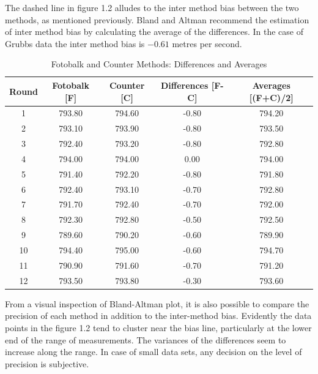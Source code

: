 \documentclass[Chap2main.tex]{subfiles}
\begin{document}
	The dashed line in figure 1.2 alludes to the inter method bias between the two methods, as mentioned previously. Bland and Altman
	recommend the estimation of inter method bias by calculating the average of the differences. In the case of Grubbs data the inter
	method bias is $-0.61$ metres per second.
	\newpage
	\begin{table}[tbh]
		\begin{center}
			
			\begin{tabular}{|c|c|c|c|c|}
				\hline
				Round & Fotobalk [F] & Counter [C] & Differences [F-C] & Averages [(F+C)/2] \\
				\hline
				1 & 793.80 & 794.60 & -0.80 & 794.20 \\
				2 & 793.10 & 793.90 & -0.80 & 793.50 \\
				3 & 792.40 & 793.20 & -0.80 & 792.80 \\
				4 & 794.00 & 794.00 & 0.00 & 794.00 \\
				5 & 791.40 & 792.20 & -0.80 & 791.80 \\
				6 & 792.40 & 793.10 & -0.70 & 792.80 \\
				7 & 791.70 & 792.40 & -0.70 & 792.00 \\
				8 & 792.30 & 792.80 & -0.50 & 792.50 \\
				9 & 789.60 & 790.20 & -0.60 & 789.90 \\
				10 & 794.40 & 795.00 & -0.60 & 794.70 \\
				11 & 790.90 & 791.60 & -0.70 & 791.20 \\
				12 & 793.50 & 793.80 & -0.30 & 793.60 \\
				\hline
			\end{tabular}
			\caption{Fotobalk and Counter Methods: Differences and Averages}
		\end{center}
	\end{table}
	
	\newpage
	
	From a visual inspection of Bland-Altman plot, it is also possible to compare the precision of each method in addition to the
	inter-method bias.  Evidently the data points in the figure 1.2 tend to cluster near the bias line, particularly at the lower end
	of the range of measurements. The variances of the differences seem to increase along the range. In case of small data sets, any
	decision on the level of precision is subjective.
	
\end{document}
